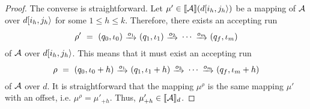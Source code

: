 \begin{proof}
    The converse is straightforward. Let $\mu' \in \llbracket\mathcal{A}\rrbracket(d[i_h, j_h\rangle)$ be a mapping of $\mathcal{A}$ over $d[i_h, j_h\rangle$ for some $1 \leq h \leq k$. Therefore, there exists an accepting run
    $$
    \rho' \ = \ (q_0, \iota_0) \ \trans{o_1} \ (q_1, \iota_1) \ \trans{o_2} \ \cdots \ \trans{o_m} \ (q_f, \iota_m)
    $$
    of $\mathcal{A}$ over $d[i_h, j_h\rangle$. This means that it must exist an accepting run
    $$
    \rho \ = \ (q_0, \iota_0+h) \ \trans{o_1} \ (q_1, \iota_1+h) \ \trans{o_2} \ \cdots \ \trans{o_m} \ (q_f, \iota_m+h)
    $$
    of $\mathcal{A}$ over $d$. It is straightforward that the mapping $\mu^\rho$ is the same mapping $\mu'$ with an offset, i.e. $\mu^\rho = \mu'_{+h}$. Thus, $\mu'_{+h} \in \llbracket\mathcal{A}\rrbracket_d$. \qedhere 
    

\end{proof}
